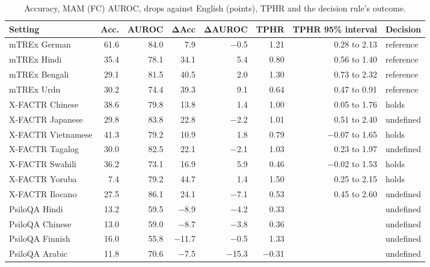 \begin{table}[!ht]
\tablestyle
\caption{Accuracy, MAM (FC) AUROC, drops against English (points), TPHR and the decision rule's outcome.}\label{tab:main}
\begin{tabular}{lrrrrrrl}
\textbf{Setting} & \textbf{Acc.} & \textbf{AUROC} & \textbf{ΔAcc} & \textbf{ΔAUROC} & \textbf{TPHR} & \textbf{TPHR 95\% interval} & \textbf{Decision} \\
\hline
mTREx German & 61.6 & 84.0 & 7.9 & −0.5 & 1.21 & 0.28 to 2.13 & reference \\
\hline
mTREx Hindi & 35.4 & 78.1 & 34.1 & 5.4 & 0.80 & 0.56 to 1.40 & reference \\
\hline
mTREx Bengali & 29.1 & 81.5 & 40.5 & 2.0 & 1.30 & 0.73 to 2.32 & reference \\
\hline
mTREx Urdu & 30.2 & 74.4 & 39.3 & 9.1 & 0.64 & 0.47 to 0.91 & reference \\
\hline
X-FACTR Chinese & 38.6 & 79.8 & 13.8 & 1.4 & 1.00 & 0.05 to 1.76 & holds \\
\hline
X-FACTR Japanese & 29.8 & 83.8 & 22.8 & −2.2 & 1.01 & 0.51 to 2.40 & undefined \\
\hline
X-FACTR Vietnamese & 41.3 & 79.2 & 10.9 & 1.8 & 0.79 & −0.07 to 1.65 & holds \\
\hline
X-FACTR Tagalog & 30.0 & 82.5 & 22.1 & −2.1 & 1.03 & 0.23 to 1.97 & undefined \\
\hline
X-FACTR Swahili & 36.2 & 73.1 & 16.9 & 5.9 & 0.46 & −0.02 to 1.53 & holds \\
\hline
X-FACTR Yoruba & 7.4 & 79.2 & 44.7 & 1.4 & 1.50 & 0.25 to 2.15 & holds \\
\hline
X-FACTR Ilocano & 27.5 & 86.1 & 24.1 & −7.1 & 0.53 & 0.45 to 2.60 & undefined \\
\hline
PsiloQA Hindi & 13.2 & 59.5 & −8.9 & −4.2 & 0.33 &  & undefined \\
\hline
PsiloQA Chinese & 13.0 & 59.0 & −8.7 & −3.8 & 0.36 &  & undefined \\
\hline
PsiloQA Finnish & 16.0 & 55.8 & −11.7 & −0.5 & 1.33 &  & undefined \\
\hline
PsiloQA Arabic & 11.8 & 70.6 & −7.5 & −15.3 & −0.31 &  & undefined
\end{tabular}
\end{table}
